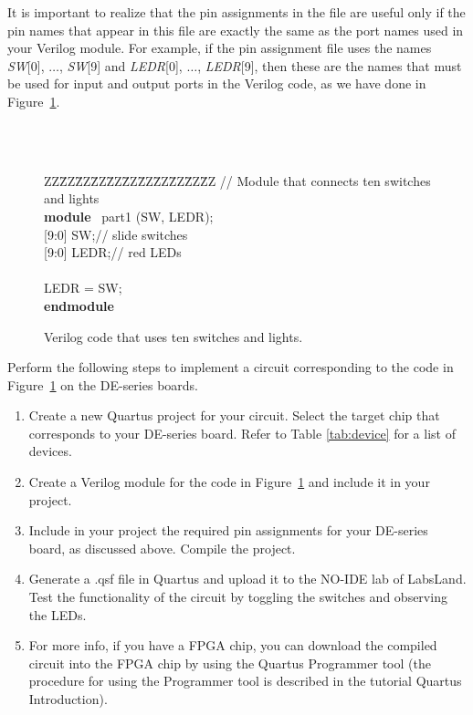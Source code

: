 \documentclass[epsfig,10pt,fullpage]{article}
\begin{document}
It is important to realize that the pin assignments in the
file are useful only if the pin names that appear in this file
are exactly the same as the port names used in your Verilog module.
For example, if the pin assignment file uses the names {\it SW}[0], $\ldots$, {\it SW}[9] 
and {\it LEDR}[0], $\ldots$, {\it LEDR}[9], then these are the names that must be used
for input and output ports in the Verilog code, as we have done in Figure~\ref{fig:1}.

~\\
~\\
\begin{figure}[H]
\begin{center}
\begin{minipage}[t]{12.5 cm}
\begin{tabbing}
ZZ\=ZZ\=ZZ\=ZZ\=ZZ\=ZZ\=ZZ\=ZZ\=ZZ\=ZZ\=ZZ\kill
// Module that connects ten switches and lights\\
{\bf module} ~part1 (SW, LEDR);\\
 [9:0] SW;\>\>\>\>\>\>\>\>// slide switches\\
 [9:0] LEDR;\>\>\>\>\>\>\>\>// red LEDs\\
~\\
 LEDR = SW;\\
{\bf endmodule}
\end{tabbing}
\end{minipage}
	\caption{Verilog code that uses ten switches and lights.}
	\label {fig:1}
\end{center}
\end{figure}

\newpage
Perform the following steps to implement a circuit corresponding to the code
in  Figure~\ref{fig:1} on the DE-series boards.
\begin{enumerate}
\item Create a new Quartus project for your circuit. Select the target chip that corresponds to your DE-series board.
Refer to Table \ref{tab:device} for a list of devices.
\item Create a Verilog module for the code in  Figure~\ref{fig:1} and include it in your project.
\item Include in your project the required pin assignments for your DE-series board, as discussed
above. Compile the project.
\item Generate a .qsf file in Quartus and upload it to the NO-IDE lab of LabsLand. Test the functionality of the 
circuit by toggling the switches and observing the LEDs.
\item For more info, if you have a FPGA chip, you can download the compiled circuit into the FPGA chip by using the Quartus Programmer tool (the procedure
	for using the Programmer tool is described in the tutorial Quartus Introduction). 
\end{enumerate}
\end{document}
